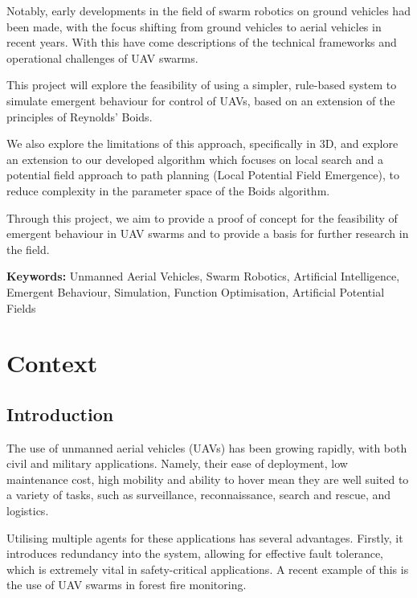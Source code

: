 \documentclass[12pt]{article}
\begin{document}
Notably, early developments in the field of swarm robotics on ground vehicles had been made\cite{Monada}, with the focus shifting from ground vehicles to aerial vehicles in recent years. With this have come descriptions of the technical frameworks\cite{Zhou} and operational challenges of UAV swarms\cite{Verdoucq}.

This project will explore the feasibility of using a simpler, rule-based system to simulate emergent behaviour for control of UAVs, based on an extension of the principles of Reynolds' Boids\cite{Reynolds}.

We also explore the limitations of this approach, specifically in 3D, and explore an extension to our developed algorithm which focuses on local search and a potential field approach to path planning (Local Potential Field Emergence), to reduce complexity in the parameter space of the Boids algorithm.

Through this project, we aim to provide a proof of concept for the feasibility of emergent behaviour in UAV swarms and to provide a basis for further research in the field.

\vspace{2cm}

\noindent\textbf{Keywords:} Unmanned Aerial Vehicles, Swarm Robotics, Artificial Intelligence, Emergent Behaviour, Simulation, Function Optimisation, Artificial Potential Fields

\newpage
\renewcommand{\baselinestretch}{1.5} 

\section{Context}
\label{sec:context}
\subsection{Introduction}
\label{sec:introduction}
The use of unmanned aerial vehicles (UAVs) has been growing rapidly, with both civil and military applications. Namely, their ease of deployment, low maintenance cost, high mobility and ability to hover mean they are well suited to a variety of tasks, such as surveillance, reconnaissance, search and rescue, and logistics\cite{Hayat}.

Utilising multiple agents for these applications has several advantages. Firstly, it introduces redundancy into the system, allowing for effective fault tolerance, which is extremely vital in safety-critical applications\cite{Perez}. A recent example of this is the use of UAV swarms in forest fire monitoring\cite{Hu}.
\end{document}
